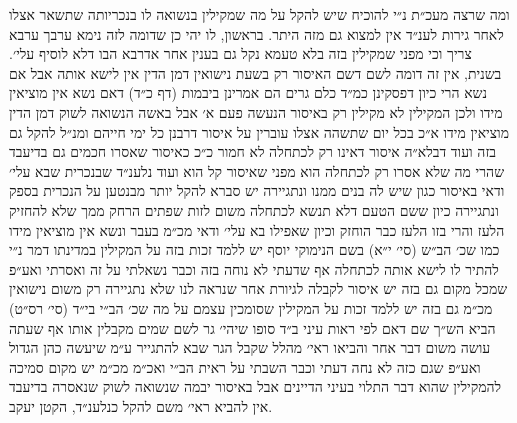 \documentclass[12pt, openany]{book}
\begin{document}
\begin{multicols}{2}
ומה שרצה מעכ״ת נ״י להוכיח שיש להקל על מה שמקילין בנשואה לו בנכריותה שתשאר אצלו לאחר גירות לענ״ד אין למצוא גם מזה היתר. בראשון, לו יהי כן שדומה לזה נימא ערבך ערבא צריך וכי מפני שמקילין בזה בלא טעמא נקל גם בענין אחר אדרבא הבו דלא לוסיף עלי׳. בשנית, אין זה דומה לשם דשם האיסור רק בשעת נישואין דמן הדין אין לישא אותה אבל אם נשא הרי כיון דפסקינן כמ״ד כלם גרים הם אמרינן ביבמות (דף כ״ד) דאם נשא אין מוציאין מידו ולכן המקילין לא מקילין רק באיסור הנעשה פעם א׳ אבל באשה הנשואה לשוק דמן הדין מוציאין מידו א״כ בכל יום שתשהה אצלו עוברין על איסור דרבנן כל ימי חייהם ומנ״ל להקל גם בזה ועוד דבלא״ה איסור דאינו רק לכתחלה לא חמור כ״כ כאיסור שאסרו חכמים גם בדיעבד שהרי מה שלא אסרו רק לכתחלה הוא מפני שאיסור קל הוא ועוד נלענ״ד שבנכרית שבא עלי׳ ודאי באיסור כגון שיש לה בנים ממנו ונתגיירה יש סברא להקל יותר מבנטען על הנכרית בספק ונתגיירה כיון ששם הטעם דלא תנשא לכתחלה משום לזות שפתים הרחק ממך שלא להחזיק הלעז והרי בזו הלעז כבר הוחזק וכיון שאפילו בא עלי׳ ודאי מכ״מ בעבר ונשא אין מוציאין מידו כמו שכ׳ הב״ש (סי׳ י״א) בשם הנימוקי יוסף יש ללמד זכות בזה על המקילין במדינתו דמר נ״י להתיר לו לישא אותה לכתחלה אף שדעתי לא נוחה בזה וכבר נשאלתי על זה ואסרתי ואע״פ שמכל מקום גם בזה יש איסור לקבלה לגיורת אחר שנראה לנו שלא נתגיירה רק משום נישואין מכ״מ גם בזה יש ללמד זכות על המקילין שסומכין עצמם על מה שכ׳ הב״י בי״ד (סי׳ רס״ט) הביא הש״ך שם דאם לפי ראות עיני ב״ד סופו שיהי׳ גר לשם שמים מקבלין אותו אף שעתה עושה משום דבר אחר והביאו ראי׳ מהלל שקבל הגר שבא להתגייר ע״מ שיעשה כהן הגדול ואע״פ שגם כזה לא נחה דעתי וכבר השבתי על ראית הב״י ואכ״מ מכ״מ יש מקום סמיכה להמקילין שהוא דבר התלוי בעיני הדיינים אבל באיסור יבמה שנשואה לשוק שנאסרה בדיעבד אין להביא ראי׳ משם להקל כנלענ״ד, הקטן יעקב.\\\vspace{0pt}

\end{multicols}\newpage
\end{document}
